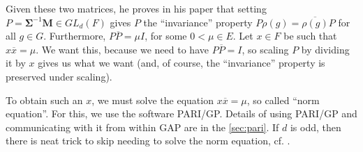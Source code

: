 \documentclass[11pt]{article}
\begin{document}
Given these two matrices, he proves in his paper that setting $P = \mathbf{\Sigma}^{-1}\mathbf{M} \in GL_d(F)$
gives $P$ the ``invariance'' property $P\rho(g) = \overline{\rho(g)}P$ for all $g \in G$. Furthermore, $P\overline{P} = \mu I$,
for some $0 < \mu \in E$. Let $x\in F$ be such that $x\overline{x} = \mu$. We want this, because we need
to have $P\overline{P} = I$, so scaling $P$ by dividing it by $x$ gives us what we want (and, of course,
the ``invariance'' property is preserved under scaling).

To obtain such an $x$, we must solve the equation $x\overline{x} = \mu$, so called ``norm equation''.
For this, we use the software PARI/GP. Details of using PARI/GP and
communicating with it from within GAP are in the \cref{sec:pari}. If $d$ is odd, then
there is neat trick to skip needing to solve the norm equation, cf. \cite[Lemma 3.4]{Pas21}.
\end{document}
